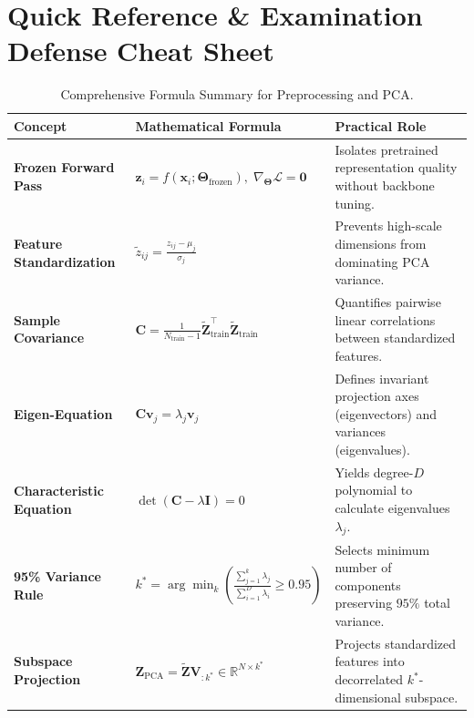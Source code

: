 \documentclass[11pt, a4paper]{article}
\begin{document}
\section{Quick Reference \& Examination Defense Cheat Sheet}

\begin{table}[H]
\centering
\small
\caption{Comprehensive Formula Summary for Preprocessing and PCA.}
\label{tab:formula_summary}
\begin{tabular}{p{3.8cm}p{5.5cm}p{4.2cm}}
\toprule
\textbf{Concept} & \textbf{Mathematical Formula} & \textbf{Practical Role} \\
\midrule
\textbf{Frozen Forward Pass} &
$\mathbf{z}_i = f(\mathbf{x}_i; \mathbf{\Theta}_{\text{frozen}}), \; \nabla_{\mathbf{\Theta}}\mathcal{L} = \mathbf{0}$ &
Isolates pretrained representation quality without backbone tuning. \\[0.8em]

\textbf{Feature Standardization} &
$\tilde{z}_{ij} = \frac{z_{ij} - \mu_j}{\sigma_j}$ &
Prevents high-scale dimensions from dominating PCA variance. \\[0.8em]

\textbf{Sample Covariance} &
$\mathbf{C} = \frac{1}{N_{\text{train}}-1}\tilde{\mathbf{Z}}_{\text{train}}^\top \tilde{\mathbf{Z}}_{\text{train}}$ &
Quantifies pairwise linear correlations between standardized features. \\[0.8em]

\textbf{Eigen-Equation} &
$\mathbf{C}\mathbf{v}_j = \lambda_j \mathbf{v}_j$ &
Defines invariant projection axes (eigenvectors) and variances (eigenvalues). \\[0.8em]

\textbf{Characteristic Equation} &
$\det(\mathbf{C} - \lambda \mathbf{I}) = 0$ &
Yields degree-$D$ polynomial to calculate eigenvalues $\lambda_j$. \\[0.8em]

\textbf{95\% Variance Rule} &
$k^* = \arg\min_k \left( \frac{\sum_{j=1}^k \lambda_j}{\sum_{i=1}^D \lambda_i} \ge 0.95 \right)$ &
Selects minimum number of components preserving $95\%$ total variance. \\[0.8em]

\textbf{Subspace Projection} &
$\mathbf{Z}_{\text{PCA}} = \tilde{\mathbf{Z}} \mathbf{V}_{:k^*} \in \mathbb{R}^{N \times k^*}$ &
Projects standardized features into decorrelated $k^*$-dimensional subspace. \\
\bottomrule
\end{tabular}
\end{table}
\end{document}
